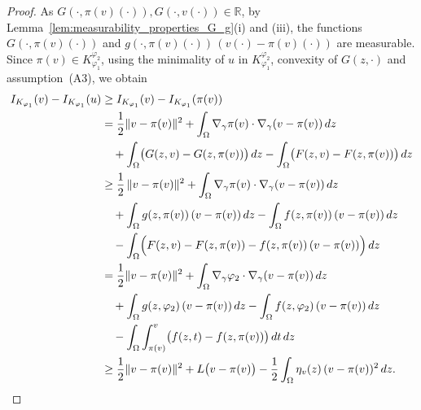 \documentclass[11pt]{article}
\newcommand{\real}{\mathbb{R}}
\newcommand{\gradgr}{\nabla_{\gamma}}
\begin{document}
\begin{proof}
As $G(\cdot, \pi(v)(\cdot)), G(\cdot, v(\cdot)) \in \real$, by Lemma~\ref{lem:measurability_properties_G_g}\textnormal{(i)} and \textnormal{(iii)}, the functions $G(\cdot,\pi(v)(\cdot))$ and $g(\cdot,\pi(v)(\cdot))\,(v(\cdot)-\pi(v)(\cdot))$ are measurable. 
Since $\pi(v) \in K_{\varphi_1}^{\varphi_2}$, using the minimality of $u$ in $K_{\varphi_1}^{\varphi_2}$, convexity of $G(z,\cdot)$ and assumption~\textnormal{(A3)}, we obtain
\begin{equation}
\label{eq:IK_key_inequality}
\begin{aligned}
I_{K_{\varphi_1}}(v) - I_{K_{\varphi_1}}(u) &\ge  I_{K_{\varphi_1}}(v) - I_{K_{\varphi_1}}(\pi(v)) \\
& = \frac{1}{2} \| v - \pi(v) \|^{2}
+ \int_{\Omega} \gradgr \pi(v) \cdot \gradgr (v-\pi(v))\, dz \\
& \quad + \int_{\Omega} \bigl( G(z,v) - G(z,\pi(v)) \bigr)\, dz
- \int_{\Omega} \bigl( F(z,v) - F(z,\pi(v)) \bigr)\, dz \\
& \ge  \frac{1}{2} \, \| v - \pi(v) \|^{2}
+ \int_{\Omega} \gradgr \pi(v) \cdot \gradgr (v-\pi(v))\, dz \\
& \quad + \int_{\Omega} g(z,\pi(v))\, (v-\pi(v))\, dz
- \int_{\Omega} f(z,\pi(v))\, (v-\pi(v))\, dz \\
& \quad  - \int_{\Omega} \Bigl( F(z,v) - F(z,\pi(v)) - f(z,\pi(v))\, (v-\pi(v)) \Bigr)\, dz \\
& = \frac{1}{2} \| v - \pi(v) \|^{2}
+ \int_{\Omega} \gradgr \varphi_2 \cdot \gradgr (v-\pi(v))\, dz \\
& \quad + \int_{\Omega} g(z,\varphi_2)\, (v-\pi(v))\, dz
- \int_{\Omega} f(z,\varphi_2)\, (v-\pi(v))\, dz \\
& \quad - \int_{\Omega} \int_{\pi(v)}^{v} \bigl( f(z,t) - f(z,\pi(v)) \bigr)\, dt \, dz \\
& \ge \frac{1}{2} \| v - \pi(v) \|^{2} + L\bigl( v - \pi(v) \bigr)
- \frac{1}{2} \int_{\Omega} \eta_{v}(z)\, (v-\pi(v))^{2}\, dz .
\end{aligned}
\end{equation}


\end{proof}
\end{document}
